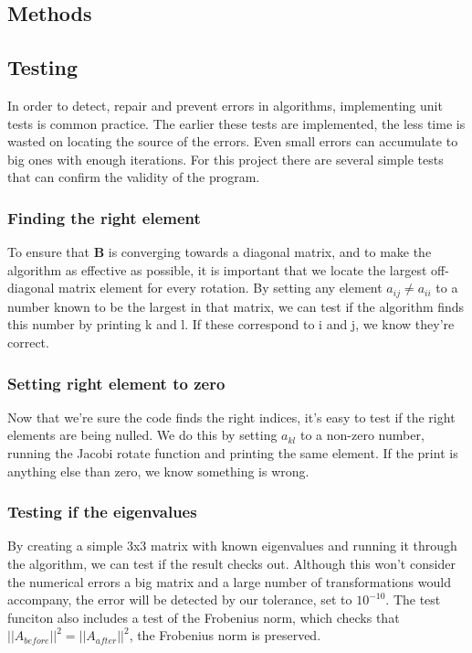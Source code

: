 \documentclass[10pt]{article}
\begin{document}
\begin{multicols}{2}
\section{Methods}
\subsection{Testing}
In order to detect, repair and prevent errors in algorithms, implementing
unit tests is common practice. The earlier these tests are implemented, the
less time is wasted on locating the source of the errors. Even small errors
can accumulate to big ones with enough iterations. For this project there
are several simple tests that can confirm the validity of the program.  

\subsubsection{Finding the right element}
To ensure that $\textbf{B}$ is converging towards a diagonal matrix, and to
make the algorithm as effective as possible, it is important that we locate
the largest off-diagonal matrix element for every rotation. By setting any
element $a_{ij}\neq a_{ii}$ to a number known to be the largest in that
matrix, we can test if the algorithm finds this number by printing k and l.
If these correspond to i and j, we know they're correct.

\subsubsection{Setting right element to zero}
Now that we're sure the code finds the right indices, it's easy to test if
the right elements are being nulled. We do this by setting $a_{kl}$ to a
non-zero number, running the Jacobi rotate function and printing the same
element. If the print is anything else than zero, we know something is
wrong.

\subsubsection{Testing if the eigenvalues}
By creating a simple 3x3 matrix with known eigenvalues and running it
through the algorithm, we can test if the result checks out. Although this
won't consider the numerical errors a big matrix and a large number of
transformations would accompany, the error will be detected by our
tolerance, set to $10^{-10}$. The test funciton also includes a test of the
Frobenius norm, which checks that $||A_{before}||^2 = ||A_{after}||^2$, the
Frobenius norm is preserved.


\end{multicols}
\end{document}
